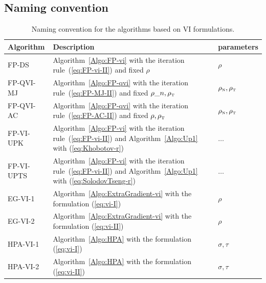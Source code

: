 \subsection{Naming convention}
\begin{table}
  \centering
  \begin{tabular}{|l|p{}|l|}
    \hline
    { Algorithm}
    & Description 
    & parameters\\
    \hline
    \sf FP-DS
    &  Algorithm~\ref{Algo:FP-vi} with the iteration rule~(\ref{eq:FP-vi-II}) and fixed $\rho$
    & $\rho$ \\
    \hline
    \sf FP-QVI-MJ
    &  Algorithm~\ref{Algo:FP-qvi} with the iteration rule~(\ref{eq:FP-MJ-II}) and fixed $\rho\_n,\rho_{\hbox{\tiny{T}}}$
    & $\rho_{\hbox{\tiny{N}}},\rho_{\hbox{\tiny{T}}}$\\
     \hline
    \sf FP-QVI-AC 
    &  Algorithm~\ref{Algo:FP-qvi} with the iteration rule~(\ref{eq:FP-AC-II}) and fixed $\rho,\rho_{\hbox{\tiny{T}}}$
    & $\rho_{\hbox{\tiny{N}}},\rho_{\hbox{\tiny{T}}}$\\
    \hline
    \sf FP-VI-UPK
    &  Algorithm~\ref{Algo:FP-vi} with the iteration rule~(\ref{eq:FP-vi-II}) and Algorithm~\ref{Algo:Up1} with (\ref{eq:Khobotov-r}) 
    & $\ldots$\\
    \hline
    \sf FP-VI-UPTS
    &  Algorithm~\ref{Algo:FP-vi} with the iteration rule~(\ref{eq:FP-vi-II}) and Algorithm~\ref{Algo:Up1} with (\ref{eq:SolodovTseng-r}) 
    & $\ldots$\\
    \hline
    \sf EG-VI-1 
    & Algorithm~\ref{Algo:ExtraGradient-vi} with the formulation (\ref{eq:vi-I})
    & $\rho$\\ 
    \hline
    \sf EG-VI-2 
    & Algorithm~\ref{Algo:ExtraGradient-vi} with the formulation (\ref{eq:vi-II})
    & $\rho$\\ 
    \hline
    \sf HPA-VI-1 
    & Algorithm~\ref{Algo:HPA} with the formulation (\ref{eq:vi-I})
    & $\sigma,\tau$\\
    \hline
    \sf HPA-VI-2 
    & Algorithm~\ref{Algo:HPA} with the formulation (\ref{eq:vi-II})
    & $\sigma,\tau$\\ 
    \hline
  \end{tabular}
  \caption{Naming convention for the algorithms based on VI formulations.}
  \label{tab:Projection-algos}
\end{table}


